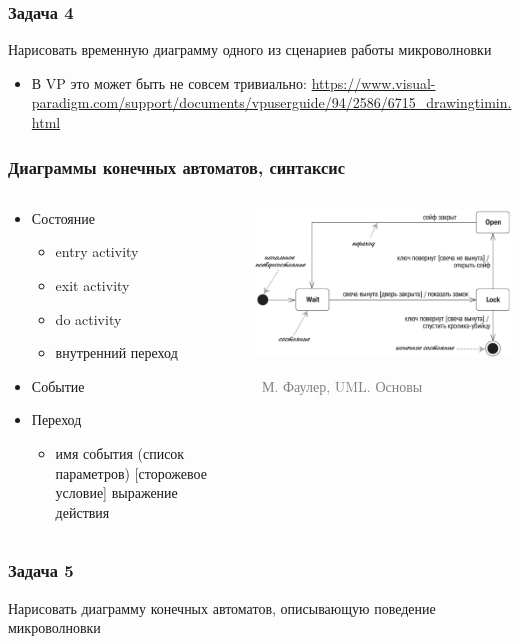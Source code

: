 \documentclass[xetex,mathserif,serif]{beamer}
\newcommand{\attribution}[1] {
	\vspace{-5mm}\begin{flushright}\begin{scriptsize}\textcolor{gray}{\textcopyright\, #1}\end{scriptsize}\end{flushright}
}
\begin{document}
	\begin{frame}
		\frametitle{Задача 4}
		Нарисовать временную диаграмму одного из сценариев работы микроволновки
		\begin{itemize}
			\item В VP это может быть не совсем тривиально: \url{https://www.visual-paradigm.com/support/documents/vpuserguide/94/2586/6715_drawingtimin.html}
		\end{itemize}
	\end{frame}

	\begin{frame}
		\frametitle{Диаграммы конечных автоматов, синтаксис}
		\begin{columns}
			\begin{column}{0.5\textwidth}
				\begin{itemize}
					\item Состояние
					\begin{itemize}
						\item entry activity
						\item exit activity
						\item do activity
						\item внутренний переход
					\end{itemize}
					\item Событие
					\item Переход
					\begin{itemize}
						\item имя события (список параметров) [сторожевое условие] выражение действия
					\end{itemize}
				\end{itemize}
			\end{column}
			\begin{column}{0.5\textwidth}
				\begin{center}
					\includegraphics[width=\textwidth]{stateTransitionSyntax.png}
					\attribution{М. Фаулер, UML. Основы}
				\end{center}
			\end{column}
		\end{columns}
	\end{frame}

	\begin{frame}
		\frametitle{Задача 5}
		Нарисовать диаграмму конечных автоматов, описывающую поведение микроволновки
	\end{frame}
\end{document}
